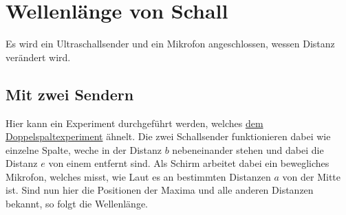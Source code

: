 \documentclass{article}
\begin{document}
\section{Wellenlänge von Schall}
Es wird ein Ultraschallsender und ein Mikrofon angeschlossen, wessen Distanz verändert wird.%
 
\subsection{Mit zwei Sendern}
Hier kann ein Experiment durchgeführt werden, welches \hyperref[Das Doppelspaltexperiment]{dem Doppelspaltexperiment} ähnelt. Die zwei Schallsender funktionieren dabei wie einzelne Spalte, weche in der Distanz $b$ nebeneinander stehen und dabei die Distanz $e$ von einem  entfernt sind. Als Schirm arbeitet dabei ein bewegliches Mikrofon, welches misst, wie Laut es an bestimmten Distanzen $a$ von der Mitte ist. Sind nun hier die Positionen der Maxima und alle anderen Distanzen bekannt, so folgt die Wellenlänge.
\end{document}
